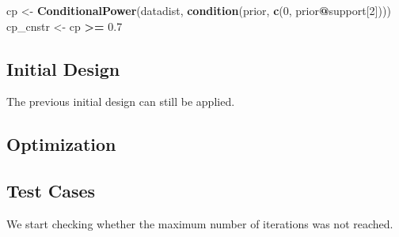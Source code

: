 \documentclass[
]{book}
\newenvironment{Shaded}{\begin{snugshade}}{\end{snugshade}}
\newcommand{\DataTypeTok}[1]{\textcolor[rgb]{0.13,0.29,0.53}{#1}}
\newcommand{\DecValTok}[1]{\textcolor[rgb]{0.00,0.00,0.81}{#1}}
\newcommand{\FloatTok}[1]{\textcolor[rgb]{0.00,0.00,0.81}{#1}}
\newcommand{\KeywordTok}[1]{\textcolor[rgb]{0.13,0.29,0.53}{\textbf{#1}}}
\newcommand{\NormalTok}[1]{#1}
\newcommand{\OperatorTok}[1]{\textcolor[rgb]{0.81,0.36,0.00}{\textbf{#1}}}
\newcommand{\StringTok}[1]{\textcolor[rgb]{0.31,0.60,0.02}{#1}}
\begin{document}
\begin{Shaded}
\begin{Highlighting}[]
\NormalTok{cp       \textless{}{-}}\StringTok{ }\KeywordTok{ConditionalPower}\NormalTok{(datadist, }\KeywordTok{condition}\NormalTok{(prior, }\KeywordTok{c}\NormalTok{(}\DecValTok{0}\NormalTok{, prior}\OperatorTok{@}\NormalTok{support[}\DecValTok{2}\NormalTok{])))}
\NormalTok{cp\_cnstr \textless{}{-}}\StringTok{ }\NormalTok{cp }\OperatorTok{\textgreater{}=}\StringTok{ }\FloatTok{0.7}
\end{Highlighting}
\end{Shaded}

\hypertarget{initial-design-4}{%
\subsection{Initial Design}\label{initial-design-4}}

The previous initial design can still be applied.

\hypertarget{optimization-5}{%
\subsection{Optimization}\label{optimization-5}}

\begin{Shaded}
\end{Shaded}

\hypertarget{test-cases-5}{%
\subsection{Test Cases}\label{test-cases-5}}

We start checking whether the maximum number of iterations was not reached.

\begin{Shaded}
\end{Shaded}
\end{document}
